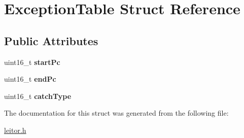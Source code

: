 \hypertarget{structExceptionTable}{}\section{Exception\+Table Struct Reference}
\label{structExceptionTable}
\subsection*{Public Attributes}
\begin{DoxyCompactItemize}
\item 
\mbox{\label{structExceptionTable_a04ab9fcb6779181df0079a864f442e15}} 
uint16\+\_\+t {\bfseries start\+Pc}
\item 
\mbox{\label{structExceptionTable_a89792e3b2a4737f8f2441fed7ec15aac}} 
uint16\+\_\+t {\bfseries end\+Pc}
\item 
\mbox{\label{structExceptionTable_ac9dbcf3326262a17a88c1ed875d6459f}} 
uint16\+\_\+t {\bfseries catch\+Type}
\end{DoxyCompactItemize}


The documentation for this struct was generated from the following file\+:\begin{DoxyCompactItemize}
\item 
\hyperlink{leitor_8h}{leitor.\+h}\end{DoxyCompactItemize}
